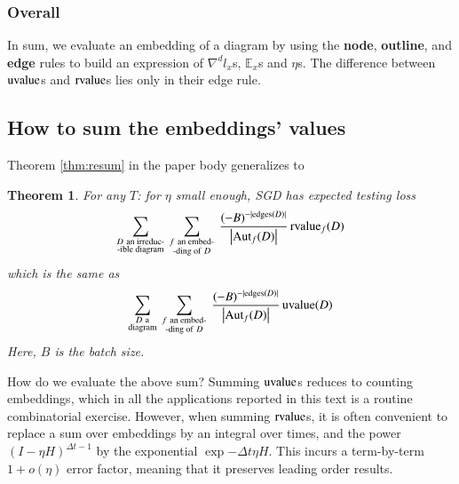\documentclass[final,12pt]{colt2021} %
\newtheorem*{thm*}{Theorem}
\newcommand{\wrap}[1]{\left(#1\right)}
\newcommand{\wabs}[1]{\left|#1\right|}
\newcommand{\Aut}{\text{\textnormal{Aut}}}
\newcommand{\uvalue}{\text{\textnormal{uvalue}}}
\newcommand{\rvalue}{\text{\textnormal{rvalue}}}
\newcommand{\edges}{\text{\textnormal{edges}}}
\newcommand{\expc}{\mathbb{E}}
\begin{document}
        \subsubsection{Overall}
            In sum, we evaluate an embedding of a diagram by using the 
            \textbf{node}, 
            \textbf{outline}, and
            \textbf{edge}
            rules to build an expression of $\nabla^d l_x$s, $\expc_x$s and
            $\eta$s.  The difference between $\uvalue$s and $\rvalue$s lies
            only in their edge rule.

    \subsection{How to sum the embeddings' values}                  \label{appendix:sum-embeddings}
        Theorem \ref{thm:resum} in the paper body generalizes to
        \begin{thm*}
            For any $T$: for $\eta$ small enough, SGD has expected testing loss
            \begin{equation*}
                \sum_{\substack{D~\text{an irreduc-} \\ \text{-ible diagram}}}
                ~
                \sum_{\substack{f~\text{an embed-} \\ \text{-ding of}~D}}
                ~
                \frac{(-B)^{-|\edges(D)|}}{\wabs{\Aut_f(D)}}
                \,
                {\rvalue_f}(D)
            \end{equation*}
            which is the same as
            \begin{equation*}
                \sum_{\substack{D~\text{a} \\ \text{diagram}}}
                ~
                \sum_{\substack{f~\text{an embed-} \\ \text{-ding of}~D}}
                ~
                \frac{(-B)^{-|\edges(D)|}}{\wabs{\Aut_f(D)}}
                \,
                {\uvalue}(D)
            \end{equation*}
            Here, $B$ is the batch size.
        \end{thm*}

        How do we evaluate the above sum?
        Summing $\uvalue$s reduces to counting embeddings, which in all the
        applications reported in this text is a routine combinatorial exercise. 
        However, when summing $\rvalue$s, it is often convenient to replace
        a sum over embeddings by an integral over times, and
        the power $\wrap{I-\eta H}^{\Delta t-1}$ by
        the exponential $\exp{-\Delta t \eta H}$.  This incurs a term-by-term
        $1+o(\eta)$ error factor, meaning that it preserves leading order
        results. 
\end{document}
